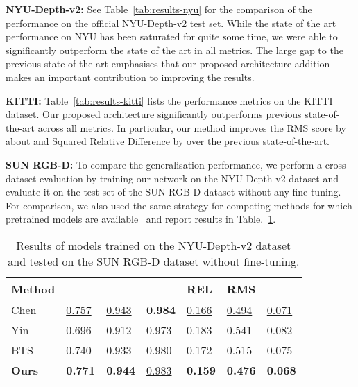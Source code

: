 \documentclass[final]{cvpr}
\begin{document}
\textbf{NYU-Depth-v2:} 
See Table~\ref{tab:results-nyu} for the comparison of the performance on the official NYU-Depth-v2 test set. While the state of the art performance on NYU has been saturated for quite some time, we were able to significantly outperform the state of the art in all metrics. The large gap to the previous state of the art emphasises that our proposed architecture addition makes an important contribution to improving the results.

\textbf{KITTI:} 
Table~\ref{tab:results-kitti} lists the performance metrics on the KITTI dataset. Our proposed architecture significantly outperforms previous state-of-the-art across all metrics. In particular, our method improves the RMS score by about  and Squared Relative Difference by  over the previous state-of-the-art. 


\textbf{SUN RGB-D:}
To compare the generalisation performance, we perform a cross-dataset evaluation by training our network on the NYU-Depth-v2 dataset and evaluate it on the test set of the SUN RGB-D dataset without any fine-tuning. For comparison, we also used the same strategy for competing methods for which pretrained models are available~\cite{bts_lee2019big,Yin_2019_ICCV,ijcai2019-98} and report results in Table.~\ref{tab:generalization}.

\begin{table}[t]
\centering
\begin{adjustbox}{width=\linewidth,center}
\begin{tabular}{@{}lllllll@{}}
\toprule
Method        &      &              &           & REL         & RMS  & \\ \midrule
Chen~\cite{ijcai2019-98}        & \underline{0.757}          & \underline{0.943}          & \textbf{0.984}         & \underline{0.166}          & \underline{0.494}  &  \underline{0.071}\\
Yin~\cite{Yin_2019_ICCV}        & 0.696          & 0.912          & 0.973          & 0.183          &  0.541  &  0.082\\
BTS~\cite{bts_lee2019big}            & 0.740          & 0.933          & 0.980          & 0.172          & 0.515  &  0.075 \\ \midrule
\textbf{Ours}                       & \textbf{0.771}  & \textbf{0.944} & \underline{0.983} & \textbf{0.159} & \textbf{0.476}  &  \textbf{0.068} \\
\bottomrule
\end{tabular}
\end{adjustbox}
\caption{Results of models trained on the NYU-Depth-v2 dataset and tested on the SUN RGB-D dataset \cite{Song2015_sunrgbd} without fine-tuning.}
\label{tab:generalization}
\end{table}
\end{document}
